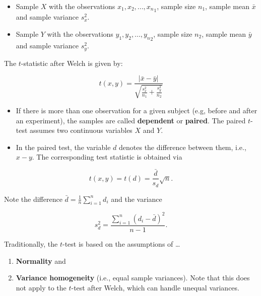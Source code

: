 \documentclass[
  11pt,
  letterpaper,
  DIV=11,
  numbers=noendperiod]{scrreprt}
\providecommand{\tightlist}{%
  \setlength{\itemsep}{0pt}\setlength{\parskip}{0pt}}\usepackage{longtable,booktabs,array}
\begin{document}
\begin{itemize}
\item
  Sample \(X\) with the observations \(x_1, x_2, ..., {x_n}_1\), sample
  size \(n_1\), sample mean \(\bar{x}\) and sample variance \(s^2_x\).
\item
  Sample \(Y\) with the observations \(y_1, y_2, ..., {y_n}_2\), sample
  size \(n_2\), sample mean \(\bar{y}\) and sample variance \(s^2_y\).
\end{itemize}

\begin{tcolorbox}[enhanced jigsaw, toprule=.15mm, opacitybacktitle=0.6, coltitle=black, arc=.35mm, colback=white, title=\textcolor{quarto-callout-note-color}{\faInfo}\hspace{0.5em}{Definition of the \(t\)-test}, titlerule=0mm, toptitle=1mm, bottomtitle=1mm, breakable, rightrule=.15mm, opacityback=0, bottomrule=.15mm, leftrule=.75mm, colframe=quarto-callout-note-color-frame, left=2mm, colbacktitle=quarto-callout-note-color!10!white]

The \(t\)-statistic after Welch is given by:

\[
t(x, y) = \frac{|\bar{x} - \bar{y}|}{\sqrt{\frac{s^2_x}{n_1} + \frac{s^2_y}{n_2}}} 
\]

\begin{itemize}
\item
  If there is more than one observation for a given subject (e.g, before
  and after an experiment), the samples are called \textbf{dependent} or
  \textbf{paired}. The paired \(t\)-test assumes two continuous
  variables \(X\) and \(Y\).
\item
  In the paired test, the variable \(d\) denotes the difference between
  them, i.e., \(x - y\). The corresponding test statistic is obtained
  via
\end{itemize}

\[
t(x, y) = t(d) = \frac{\bar{d}}{s_d} \sqrt{n}.
\]

Note the difference \(\bar{d} = \frac{1}{n}\sum_{i=1}^n{d_i}\) and the
variance

\[
s^2_d = \frac{\sum_{i=1}^n({d_i} - \bar{d})^2}{n-1}.
\]

Traditionally, the \(t\)-test is based on the assumptions of \ldots{}

\begin{enumerate}
\def\labelenumi{\arabic{enumi}.}
\tightlist
\item
  \textbf{Normality} and
\item
  \textbf{Variance homogeneity} (i.e., equal sample variances). Note
  that this does not apply to the \(t\)-test after Welch, which can
  handle unequal variances.
\end{enumerate}

\end{tcolorbox}
\end{document}
